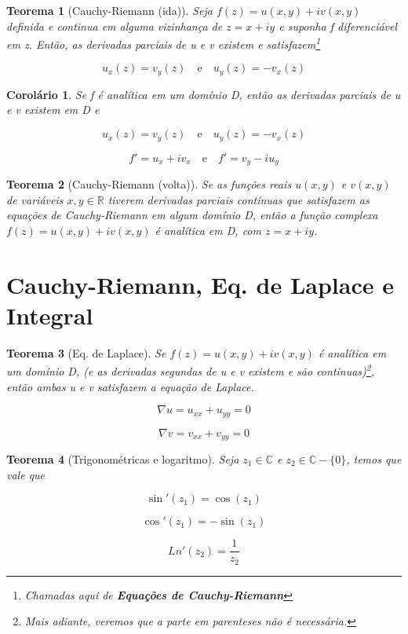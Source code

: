 \documentclass{article}
\newtheorem{theorem}{Teorema}
\newtheorem{corollary}{Corolário}[theorem]
\begin{document}
\begin{theorem}[Cauchy-Riemann (ida)]
Seja $f(z) = u(x, y) + i v(x, y)$ definida e continua em alguma vizinhança de $z = x + i y$ e suponha f diferenciável em z. Então, as derivadas parciais de u e v existem e satisfazem\footnote{Chamadas aqui de \textbf{Equações de Cauchy-Riemann}}

$$u_x(z) = v_y(z)\quad\text{e}\quad u_y(z) = - v_x(z)$$
\end{theorem}

\begin{corollary}
Se f é analítica em um domínio D, então as derivadas parciais de u e v existem em D e

$$u_x(z) = v_y(z)\quad \text{e} \quad u_y(z) = - v_x(z)$$

$$f' = u_x + i v_x\quad \text{e} \quad f' = v_y - i u_y$$
\end{corollary}

\begin{theorem}[Cauchy-Riemann (volta)]
Se as funções reais $u(x, y)$ e $v(x, y)$ de variáveis $x, y \in \mathbb{R}$ tiverem derivadas parciais contínuas que satisfazem as equações de Cauchy-Riemann em algum domínio D, então a função complexa $f(z) = u(x, y) + i v(x, y)$ é analítica em D, com $z = x + iy$.
\end{theorem}

\section*{Cauchy-Riemann, Eq. de Laplace e Integral}
\label{s4}
\begin{theorem}[Eq. de Laplace]
Se $f(z) = u(x, y) + i v(x, y)$ é analítica em um domínio D, (e as derivadas segundas de u e v existem e são continuas)\footnote{Mais adiante, veremos que a parte em parenteses não é necessária.}, então ambas u e v satisfazem a equação de Laplace.

$$\nabla u = u_{xx} + u_{yy} = 0$$

$$\nabla v = v_{xx} + v_{yy} = 0$$
\end{theorem}

\begin{theorem}[Trigonométricas e logaritmo]
Seja $z_1 \in \mathbb{C}$ e $z_2 \in \mathbb{C} - \{ 0 \}$, temos que vale que

$$\sin'(z_1) = \cos(z_1)$$

$$\cos'(z_1) = - \sin(z_1)$$

$$Ln'(z_2) = \frac{1}{z_2}$$
\end{theorem}
\end{document}
